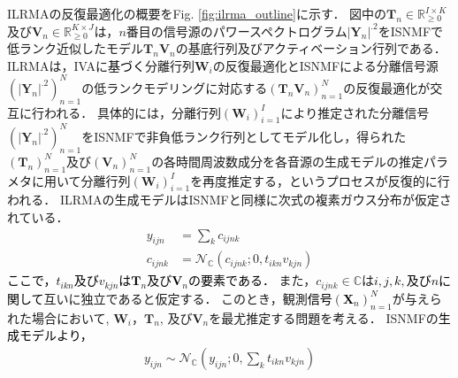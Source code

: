 \documentclass[10.5pt]{jarticle}
\begin{document}
ILRMAの反復最適化の概要をFig. \ref{fig:ilrma_outline}に示す．
{図中の}$\bm{T}_n\in\mathbb{R}_{\geq 0}^{I\times K}$及び$\bm{V}_n\in\mathbb{R}_{\geq 0}^{K\times J}$は，$n$番目の信号源のパワースペクトログラム$|\bm{Y}_n|^{.2}$をISNMFで低ランク近似したモデル$\bm{T}_n\bm{V}_n$の基底行列及びアクティベーション行列である．
ILRMAは，IVAに\textcolor{black}{基づく}分離行列$\bm{W}_i$の反復最適化とISNMFによる分離信号源$( |\bm{Y}_n|^{.2} )_{n=1}^N$の低ランクモデリングに対応する$( \bm{T}_n\bm{V}_n )_{n=1}^N$の反復最適化が交互に行われる．
具体的には，分離行列$( \bm{W}_i )_{i=1}^I$により推定された分離信号$( |\bm{Y}_n|^{.2} )_{n=1}^N$をISNMFで非負低ランク行列としてモデル化し，得られた$( \bm{T}_n )_{n=1}^N$及び$( \bm{V}_n )_{n=1}^N$の各時間周波数成分を各音源の生成モデルの推定パラメタに用いて分離行列$( \bm{W}_i )_{i=1}^I$を再度推定する，というプロセスが反復的に行われる．
ILRMAの生成モデルはISNMFと同様に次式の複素ガウス分布が仮定されている．
\begin{align}
    y_{ijn} &= \sum_k c_{ijnk} \\
    c_{ijnk} &= \mathcal{N}_{\mathbb{C}}(c_{ijnk}; 0, t_{ikn} v_{kjn}) \label{eq:ilrma_gen}
\end{align}
\textcolor{black}{ここで，$t_{ikn}$及び$v_{kjn}$は$\bm{T}_n$及び$\bm{V}_n$の要素である．}
また，$c_{ijnk} \in \mathbb{C}$は\textcolor{black}{$i, j, k, $及び$n$に関して}互いに独立であると仮定する．
このとき，観測\textcolor{black}{信号$(\bm{X}_n)_{n=1}^N$}が与えられた場合において, $\bm{W}_i$，$\bm{T}_n$, 及び$\bm{V}_n$を最尤推定する問題を考える．
ISNMFの\textcolor{black}{生成モデルより，}
\begin{align}
    y_{ijn} \sim \mathcal{N}_{\mathbb{C}}\left(y_{ijn};  0, \sum_k t_{ikn} v_{kjn} \right) 
　　\label{eq:ISNMFmodel}
\end{align}
\end{document}
